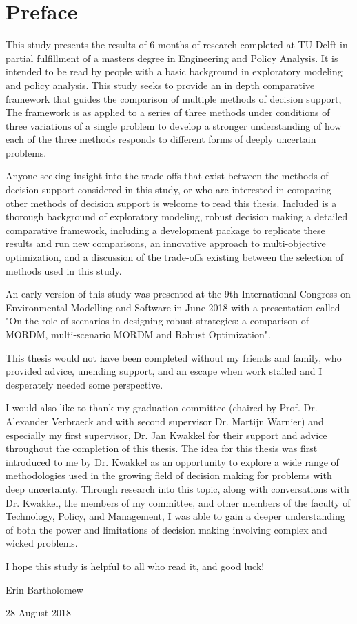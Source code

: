 \chapter{Preface}

This study presents the results of 6 months of research completed at TU Delft in partial fulfillment of a masters degree in Engineering and Policy Analysis. It is intended to be read by people with a basic background in exploratory modeling and policy analysis. This study seeks to provide an in depth comparative framework that guides the comparison of multiple methods of decision support, The framework is as applied to a series of three methods under conditions of three variations of a single problem to develop a stronger understanding of how each of the three methods responds to different forms of deeply uncertain problems. 

Anyone seeking insight into the trade-offs that exist between the methods of decision support considered in this study, or who are interested in comparing other methods of decision support is welcome to read this thesis. Included is a thorough background of exploratory modeling, robust decision making a detailed comparative framework, including a development package to replicate these results and run new comparisons, an innovative approach to multi-objective optimization, and a discussion of the trade-offs existing between the selection of methods used in this study.

An early version of this study was presented at the	9th International Congress on Environmental Modelling and Software in June 2018 with a presentation called "On the role of scenarios in designing robust strategies: a comparison of MORDM, multi-scenario MORDM and Robust Optimization".

\vspace{25pt}

This thesis would not have been completed without my friends and family, who provided advice, unending support, and an escape when work stalled and I desperately needed some perspective. 

I would also like to thank my graduation committee (chaired by Prof. Dr. Alexander Verbraeck and with second supervisor Dr. Martijn Warnier) and especially my first supervisor, Dr. Jan Kwakkel for their support and advice throughout the completion of this thesis. The idea for this thesis was first introduced to me by Dr. Kwakkel as an opportunity to explore a wide range of methodologies used in the growing field of decision making for problems with deep uncertainty. Through research into this topic, along with conversations with Dr. Kwakkel, the members of my committee, and other members of the faculty of Technology, Policy, and Management, I was able to gain a deeper understanding of both the power and limitations of decision making involving complex and wicked problems. 

I hope this study is helpful to all who read it, and good luck!

Erin Bartholomew 

28 August 2018
